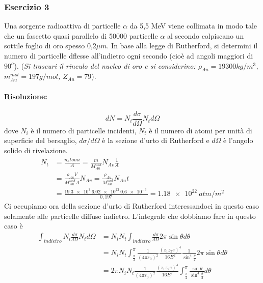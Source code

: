 \newpage
\subsubsection{Esercizio 3}
Una sorgente radioattiva di particelle $\alpha$ da 5,5 MeV viene collimata in modo tale che un fascetto quasi parallelo di 50000 particelle $\alpha$ al secondo colpiscano un sottile foglio di oro spesso 0,2$\mu m$.
In base alla legge di Rutherford, si determini il numero di particelle dflesse all'indietro ogni secondo (cioè ad angoli maggiori di $90^o$).
(\emph{Si trascuri il rinculo del nucleo di oro e si considerino: $\rho_{Au}=19300 kg/m^3$, $m_{Au}^{mol}=197 g/mol$, $Z_{Au}=79$}).

\paragraph{Risoluzione:}
\begin{equation}
dN=N_i\frac{d\sigma}{d\Omega}N_{t}d\Omega
\end{equation}
dove $N_i$ è il numero di particelle incidenti, $N_t$ è il numero di atomi per unità di superficie del bersaglio, $d\sigma/d\Omega$ è la sezione d'urto di Rutherford e $d\Omega$ è l'angolo solido di rivelazione.
\begin{equation}
\begin{split}
N_t&=\frac{n_atomi}{A}=\frac{m}{M_{Au}^{mol}}N_{Av}\frac{1}{A}\\
&=\frac{\rho_{Au}V}{M_{Au}^{mol}A}N_{Av}=\frac{\rho_{Au}}{M_{Au}^{mol}}N_{Au}t\\
&=\frac{\SI{19,3e3}{}\SI{6,02e23}{}\SI{0,6e-6}{}}{0,197}=\SI{1,18e22}{atm/m^2}
\end{split}
\end{equation}
Ci occupiamo ora della sezione d'urto di Rutherford interessandoci in questo caso solamente alle particelle diffuse indietro. 
L'integrale che dobbiamo fare in questo caso è
\begin{equation}
\begin{split}
\int_{indietro}N_i\frac{d\sigma}{d\Omega}N_td\Omega &=N_iN_t\int_{indietro}\frac{d\sigma}{d\Omega}2\pi \sin\theta d\theta\\
&=N_iN_t\int_{\frac{\pi}{2}}^{\pi}\frac{1}{(4\pi\varepsilon_0)^2}\frac{(z_1z_2e)^4}{16E^2}\frac{1}{\sin^4\frac{\theta}{2}}2\pi\sin\theta d\theta\\
&=2\pi N_iN_t\frac{1}{(4\pi\varepsilon_0)^2}\frac{(z_1z_2e)^4}{16E^2}\int_{\frac{\pi}{2}}^{\pi}\frac{\sin\theta}{\sin^4\frac{\theta}{2}}d\theta
\end{split}
\end{equation}

